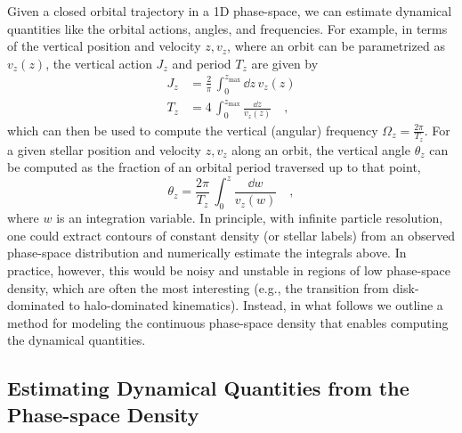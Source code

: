 Given a closed orbital trajectory in a 1D phase-space, we can estimate dynamical
quantities like the orbital actions, angles, and frequencies.
For example, in terms of the vertical position and velocity $z, v_z$, where an orbit can
be parametrized as $v_z(z)$, the vertical action $J_z$ and period $T_z$ are given by
\begin{align}
    J_z &= \frac{2}{\pi} \, \int_0^{z_{\textrm{max}}} \dd z \, v_z(z) \\
    T_z &= 4 \, \int_0^{z_{\textrm{max}}} \frac{\dd z}{v_z(z)}\quad ,
\end{align}
which can then be used to compute the vertical (angular) frequency $\Omega_z =
\frac{2\pi}{T_z}$.
For a given stellar position and velocity $z, v_z$ along an orbit, the vertical angle
$\theta_z$ can be computed as the fraction of an orbital period traversed up to that
point,
\begin{equation}
    \theta_z = \frac{2\pi}{T_z} \, \int_0^{z} \frac{\dd w}{v_z(w)} \quad ,
\end{equation}
where $w$ is an integration variable.
In principle, with infinite particle resolution, one could extract contours of constant
density (or stellar labels) from an observed phase-space distribution and numerically
estimate the integrals above.
In practice, however, this would be noisy and unstable in regions of low phase-space
density, which are often the most interesting (e.g., the transition from disk-dominated
to halo-dominated kinematics).
Instead, in what follows we outline a method for modeling the continuous phase-space
density that enables computing the dynamical quantities.


\subsection{Estimating Dynamical Quantities from the Phase-space Density}

